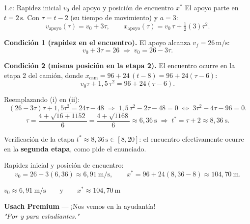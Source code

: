 \documentclass[letterpaper, 11pt]{article}
\begin{document}
\begin{paso}{1.c: Rapidez inicial $v_0$ del apoyo y posici\'on de encuentro $x^{*}$}
El apoyo parte en $t=2\,\mathrm{s}$. Con $\tau=t-2$ (su tiempo de movimiento) y $a=3$:
\[
v_{\text{apoyo}}(\tau)=v_0+3\tau,\qquad
x_{\text{apoyo}}(\tau)=v_0\,\tau+\tfrac12(3)\tau^2 .
\]

\textbf{Condici\'on 1 (rapidez en el encuentro).} El apoyo alcanza $v_f=26\,\mathrm{m/s}$:
\[
v_0+3\tau=26 \;\Rightarrow\; v_0=26-3\tau. \tag{i}
\]

\textbf{Condici\'on 2 (misma posici\'on en la etapa 2).} El encuentro ocurre en la
etapa 2 del cami\'on, donde $x_{\text{cam}}=96+24\,(t-8)=96+24(\tau-6)$:
\[
v_0\tau+1{,}5\,\tau^2 = 96+24(\tau-6). \tag{ii}
\]

Reemplazando (i) en (ii):
\[
(26-3\tau)\tau+1{,}5\tau^2 = 24\tau-48
\;\Longrightarrow\; 1{,}5\,\tau^2-2\tau-48=0
\;\Longleftrightarrow\; 3\tau^2-4\tau-96=0.
\]
\[
\tau=\frac{4+\sqrt{16+1152}}{6}=\frac{4+\sqrt{1168}}{6}\approx 6{,}36\ \mathrm{s}
\;\Rightarrow\; t^{*}=\tau+2\approx 8{,}36\ \mathrm{s}.
\]
\begin{justif}{Verificaci\'on de la etapa}
$t^{*}\approx 8{,}36\,\mathrm{s}\in[8,20]$: el encuentro efectivamente ocurre en la
\textbf{segunda etapa}, como pide el enunciado.
\end{justif}

Rapidez inicial y posici\'on de encuentro:
\[
v_0=26-3(6{,}36)\approx 6{,}91\ \mathrm{m/s},\qquad
x^{*}=96+24(8{,}36-8)\approx 104{,}70\ \mathrm{m}.
\]
\begin{resultado}\centering
$\displaystyle v_0 \approx 6{,}91\ \mathrm{m/s}\qquad\text{y}\qquad x^{*}\approx 104{,}70\ \mathrm{m}$
\end{resultado}
\end{paso}

\vspace{0.6cm}
\begin{center}
    \small\textbf{Usach Premium} --- ¡Nos vemos en la ayudant\'ia! \\
    \textit{"Por y para estudiantes."}
\end{center}
\end{document}
